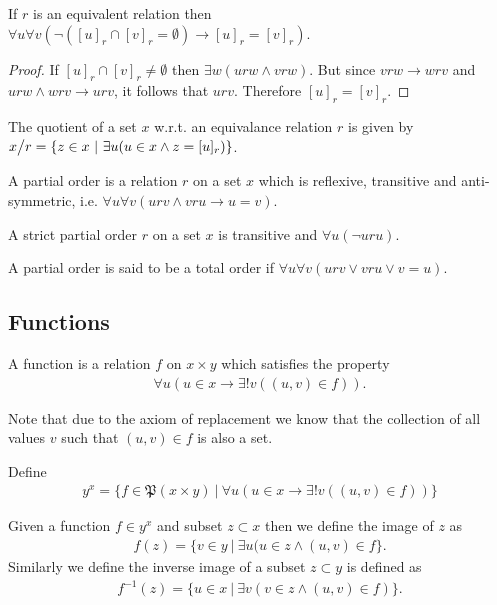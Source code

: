 \begin{proposition}
  If $r$ is an equivalent relation then $\forall u \forall v( \lnot ([u]_r \cap [v]_r = \emptyset) \to [u]_r = [v]_r)$.
\end{proposition}
\begin{proof}
  If $[u]_r\cap [v]_r \neq \emptyset$ then $\exists w (urw \land vrw)$. But since $vrw \to wrv$ and $urw \land wrv \to urv$, it follows that $urv$. Therefore $[u]_r = [v]_r$.
\end{proof}
\begin{definition}
  The quotient of a set $x$ w.r.t. an equivalance relation $r$ is given by $x\bign/r = \{z\in x\ |\ \exists u(u\in x\land z= [u]_r)\}$.
\end{definition}
\begin{definition}
  A partial order is a relation $r$ on a set $x$ which is reflexive, transitive and anti-symmetric, i.e. $\forall u\forall v(urv \land vru \to u=v)$.
\end{definition}
\begin{definition}
  A strict partial order $r$ on a set $x$ is transitive and $\forall u(\lnot uru)$.  
\end{definition}
\begin{definition}
  A partial order is said to be a total order if $\forall u \forall v (urv \lor vru \lor v=u)$.
\end{definition}
\subsection{Functions}
\begin{definition}
  A function is a relation $f$ on $x\times y$ which satisfies the property
  \begin{align*}
    \forall u (u\in x \to \exists !v((u,v)\in f)). 
  \end{align*}
\end{definition}
\begin{remark}
  Note that due to the axiom of replacement we know that the collection of all values $v$ such that $(u,v)\in f$ is also a set.
\end{remark}
\begin{definition}
  Define 
  \begin{align*}
    y^x = \{f\in \mathfrak{P}(x\times y)\ |\ \forall u (u\in x \to \exists !v((u,v)\in f)) \}
  \end{align*}
\end{definition}
\begin{definition}
  Given a function $f\in y^x$ and subset $z\subset x$ then we define the image of $z$ as
  \begin{align*}
    f(z) = \{v\in y\ |\ \exists u( u\in z \land (u,v)\in f\}.
  \end{align*}
  Similarly we define the inverse image of a subset $z\subset y$ is defined as
  \begin{align*}
    f^{-1}(z) = \{u\in x\ |\ \exists v(v\in z \land (u,v)\in f)\}.
  \end{align*}
\end{definition}
